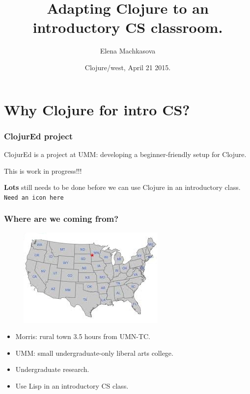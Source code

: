 \documentclass{beamer}
\begin{document}
\title{Adapting Clojure to an introductory CS classroom.}
\author{Elena Machkasova}
\date[]  
{Clojure/west, April 21 2015.}

\begin{frame}
  \titlepage
\end{frame}

\section{Why Clojure for intro CS?}

\begin{frame}
   \frametitle{ClojurEd project}
ClojurEd is a project at UMM: developing a beginner-friendly setup for Clojure. 


This is work in progress!!! 

{\large\bf  Lots}  still needs to be done before we can use Clojure in an introductory class. 
{\tt Need an icon here}
\end{frame}

\begin{frame}
   \frametitle{Where are we coming from?}
\begin{figure}
\includegraphics[scale=0.7]{morris.jpg}
\end{figure}
\begin{itemize}
\item Morris: rural town 3.5 hours from UMN-TC. 
\item UMM:  small undergraduate-only liberal arts college.
\item Undergraduate research. 
\item<2>Use Lisp in an introductory CS class. 
\end{itemize}
\end{frame}
\end{document}
